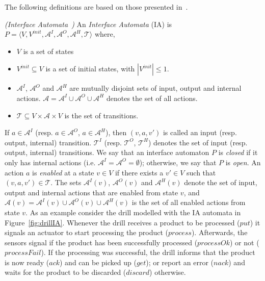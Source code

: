 

The following definitions are based on those presented in~\cite{alfaro01}.

\begin{definition}\label{def:IA}\emph{(Interface Automata~\cite{alfaro01})}
An \emph{Interface Automata} (IA) is $P=\langle V, V^{init}, \mathcal{A}^I, \mathcal{A}^O, \mathcal{A}^H, \mathcal{T} \rangle$ where,
\begin{itemize}
  \item $V$ is a set of states
  \item $V^{init} \subseteq V$ is a set of initial states, with
      $|V^{init}| \leq 1$.
  \item $\mathcal{A}^I$, $\mathcal{A}^O$ and $\mathcal{A}^H$
      are mutually disjoint sets of input, output and internal
      actions. $\mathcal{A}=\mathcal{A}^I \cup \mathcal{A}^O
      \cup \mathcal{A}^H$ denotes the set of all actions.
  \item $\mathcal{T} \subseteq V \times \mathcal{A} \times V$
      is the set of transitions.
\end{itemize}
\end{definition}

If $a\in \mathcal{A}^I$ (resp. $a\in \mathcal{A}^O$, $a\in
\mathcal{A}^H$), then $(v, a, v')$ is called an input (resp.
output, internal) transition. $\mathcal{T}^I$ (resp.
$\mathcal{T}^O$, $\mathcal{T}^H$) denotes the set of input (resp.
output, internal) transitions. We say that an interface automaton
$P$ is \emph{closed} if it only has internal actions (i.e.
$\mathcal{A}^I = \mathcal{A}^O = \emptyset$); otherwise, we say
that $P$ is \emph{open}. An action $a$ is \emph{enabled} at a state
$v\in V$ if there exists a $v'\in V$ such that
$(v,a,v')\in\mathcal{T}$. The sets $\mathcal{A}^I(v)$,
$\mathcal{A}^O(v)$ and $\mathcal{A}^H(v)$ denote the set of input,
output and internal actions that are enabled from state $v$, and
$\mathcal{A}(v)=\mathcal{A}^I(v) \cup \mathcal{A}^O(v)\cup
\mathcal{A}^H(v)$ is the set of all enabled actions from state $v$.
As an example consider the drill modelled with the IA automata in
Figure~\ref{fig:drillIA}. Whenever the drill receives a product to
be processed ($put$) it signals an actuator to start processing the
product ($process$). Afterwards, the sensors signal if the product
has been successfully processed ($processOk$) or not
($processFail$). If the processing was successful, the drill
informs that the product is now ready ($ack$) and can be picked up
($get$); or report an error ($nack$) and waits for the product to
be discarded ($discard$) otherwise.



